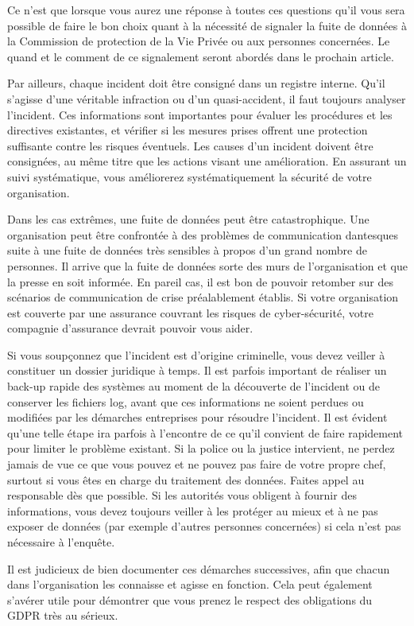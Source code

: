 Ce n’est que lorsque vous aurez une réponse à toutes ces questions qu’il vous sera possible de faire le bon choix quant à la nécessité de signaler la fuite de données à la Commission de protection de la Vie Privée ou aux personnes concernées. Le quand et le comment de ce signalement seront abordés dans le prochain article.

Par ailleurs, chaque incident doit être consigné dans un registre interne. Qu’il s’agisse d’une véritable infraction ou d’un quasi-accident, il faut toujours analyser l’incident. Ces informations sont importantes pour évaluer les procédures et les directives existantes, et vérifier si les mesures prises offrent une protection suffisante contre les risques éventuels. Les causes d’un incident doivent être consignées, au même titre que les actions visant une amélioration. En assurant un suivi systématique, vous améliorerez systématiquement la sécurité de votre organisation.

Dans les cas extrêmes, une fuite de données peut être catastrophique. Une organisation peut être confrontée à des problèmes de communication dantesques suite à une fuite de données très sensibles à propos d’un grand nombre de personnes. Il arrive que la fuite de données sorte des murs de l’organisation et que la presse en soit informée. En pareil cas, il est bon de pouvoir retomber sur des scénarios de communication de crise préalablement établis. Si votre organisation est couverte par une assurance couvrant les risques de cyber-sécurité, votre compagnie d’assurance devrait pouvoir vous aider.

Si vous soupçonnez que l’incident est d’origine criminelle, vous devez veiller à constituer un dossier juridique à temps. Il est parfois important de réaliser un back-up rapide des systèmes au moment de la découverte de l’incident ou de conserver les fichiers log, avant que ces informations ne soient perdues ou modifiées par les démarches entreprises pour résoudre l’incident. Il est évident qu’une telle étape ira parfois à l’encontre de ce qu’il convient de faire rapidement pour limiter le problème existant. Si la police ou la justice intervient, ne perdez jamais de vue ce que vous pouvez et ne pouvez pas faire de votre propre chef, surtout si vous êtes en charge du traitement des données. Faites appel au responsable dès que possible. Si les autorités vous obligent à fournir des informations, vous devez toujours veiller à les protéger au mieux et à ne pas exposer de données (par exemple d’autres personnes concernées) si cela n’est pas nécessaire à l’enquête.

Il est judicieux de bien documenter ces démarches successives, afin que chacun dans l’organisation les connaisse et agisse en fonction. Cela peut également s’avérer utile pour démontrer que vous prenez le respect des obligations du GDPR très au sérieux.



